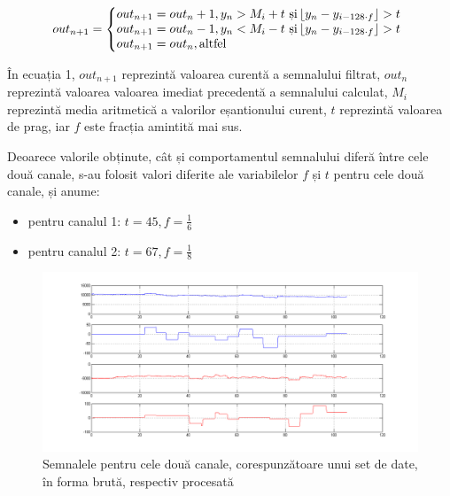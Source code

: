 \documentclass[12pt]{article}
\begin{document}
	\begin{equation}
	out_{n+1}=\left\{
	\begin{array}{@{} l c @{}}
	out_{n+1} = out_n + 1, y_n > M_i + t \mbox{ și} \left\lfloor y_n - y_{i-128 \cdot f} \right\rfloor > t\\
	out_{n+1} = out_n - 1, y_n < M_i - t \mbox{ și} \left\lfloor y_n - y_{i-128 \cdot f} \right\rfloor > t\\
	out_{n+1} = out_n, \mbox{altfel}
	\end{array}\right.
	\label{eq4}
	\end{equation}
	\begin{multicols}{2}
	În ecuația 1, $out_{n+1}$ reprezintă valoarea curentă a semnalului filtrat, $out_n$ reprezintă valoarea valoarea imediat precedentă a semnalului calculat, $M_i$ reprezintă media aritmetică a valorilor eșantionului curent, $t$ reprezintă valoarea de prag, iar $f$ este fracția amintită mai sus.
	
	Deoarece valorile obținute, cât și comportamentul semnalului diferă între cele două canale, s-au folosit valori diferite ale variabilelor $f$ și $t$ pentru cele două canale, și anume:
	\begin{itemize}[noitemsep, nolistsep]
		\item pentru canalul 1: $t = 45, f = \frac{1}{6}$
		\item pentru canalul 2: $t = 67, f = \frac{1}{8}$
	\end{itemize}
	\end{multicols}
	
	\begin{figure}[h]
		\caption {Semnalele pentru cele două canale, corespunzătoare unui set de date, în forma brută, respectiv procesată}
		\includegraphics[width=\textwidth]{graph}	
	\end{figure}
	
\end{document}
